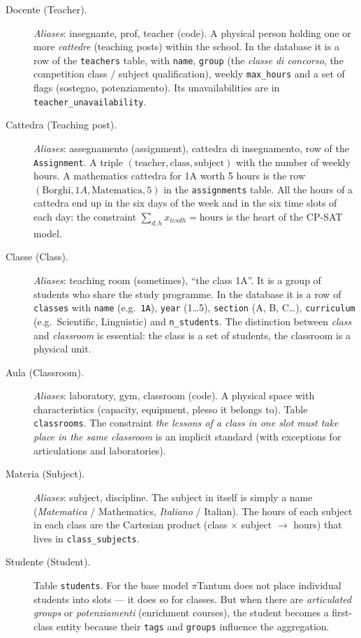 \begin{description}
\item[Docente (Teacher).]
  \emph{Aliases}: insegnante, prof, teacher (code). A physical
  person holding one or more \emph{cattedre} (teaching posts)
  within the school. In the database it is a row of the
  \texttt{teachers} table, with \texttt{name}, \texttt{group} (the
  \emph{classe di concorso}, the competition class / subject
  qualification), weekly \texttt{max\_hours} and a set of flags
  (sostegno, potenziamento). Its unavailabilities are in
  \texttt{teacher\_unavailability}.

\item[Cattedra (Teaching post).]
  \emph{Aliases}: assegnamento (assignment), cattedra di
  insegnamento, row of the \texttt{Assignment}. A triple
  $(\text{teacher},\text{class},\text{subject})$ with the number
  of weekly hours. A mathematics cattedra for 1A worth 5 hours is
  the row $(\text{Borghi}, 1A, \text{Matematica}, 5)$ in the
  \texttt{assignments} table. All the hours of a cattedra end up
  in the six days of the week and in the six time slots of each
  day: the constraint $\sum_{d,h} x_{tcsdh} = \text{hours}$ is the
  heart of the CP-SAT model.

\item[Classe (Class).]
  \emph{Aliases}: teaching room (sometimes), ``the class 1A''.
  It is a group of students who share the study programme. In the
  database it is a row of \texttt{classes} with \texttt{name}
  (e.g.\ \texttt{1A}), \texttt{year} (1\ldots5), \texttt{section}
  (A, B, C\ldots), \texttt{curriculum} (e.g.\ Scientific,
  Linguistic) and \texttt{n\_students}. The distinction between
  \emph{class} and \emph{classroom} is essential: the class is a
  set of students, the classroom is a physical unit.

\item[Aula (Classroom).]
  \emph{Aliases}: laboratory, gym, classroom (code). A physical
  space with characteristics (capacity, equipment, plesso it
  belongs to). Table \texttt{classrooms}. The constraint \emph{the
  lessons of a class in one slot must take place in the same
  classroom} is an implicit standard (with exceptions for
  articulations and laboratories).

\item[Materia (Subject).]
  \emph{Aliases}: subject, discipline. The subject in itself is
  simply a name (\emph{Matematica} / Mathematics, \emph{Italiano}
  / Italian). The hours of each subject in each class are the
  Cartesian product (class $\times$ subject $\to$ hours) that
  lives in \texttt{class\_subjects}.

\item[Studente (Student).]
  Table \texttt{students}. For the base model $\pi$Tantum does not
  place individual students into slots --- it does so for classes.
  But when there are \emph{articulated groups} or
  \emph{potenziamenti} (enrichment courses), the student becomes a
  first-class entity because their \texttt{tags} and
  \texttt{groups} influence the aggregation.
\end{description}

